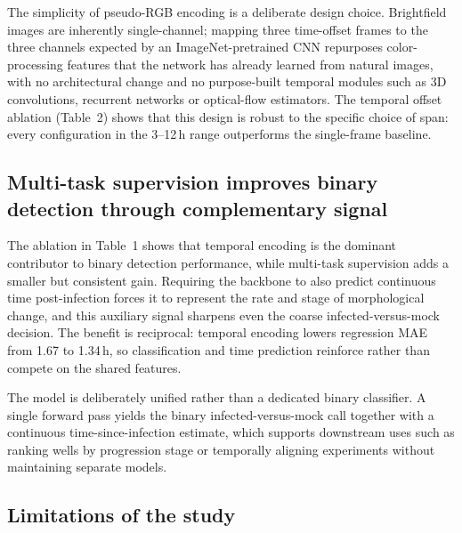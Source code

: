 \documentclass[12pt,letterpaper]{article}
\begin{document}
The simplicity of pseudo-RGB encoding is a deliberate design choice. Brightfield images are inherently single-channel; mapping three time-offset frames to the three channels expected by an ImageNet-pretrained CNN repurposes color-processing features that the network has already learned from natural images, with no architectural change and no purpose-built temporal modules such as 3D convolutions, recurrent networks or optical-flow estimators. The temporal offset ablation (Table~2) shows that this design is robust to the specific choice of span: every configuration in the 3--12\,h range outperforms the single-frame baseline.

\subsection*{Multi-task supervision improves binary detection through complementary signal}

The ablation in Table~1 shows that temporal encoding is the dominant contributor to binary detection performance, while multi-task supervision adds a smaller but consistent gain. Requiring the backbone to also predict continuous time post-infection forces it to represent the rate and stage of morphological change, and this auxiliary signal sharpens even the coarse infected-versus-mock decision.\cite{ref-caruana1997mtl} The benefit is reciprocal: temporal encoding lowers regression MAE from 1.67 to 1.34\,h, so classification and time prediction reinforce rather than compete on the shared features.

The model is deliberately unified rather than a dedicated binary classifier. A single forward pass yields the binary infected-versus-mock call together with a continuous time-since-infection estimate, which supports downstream uses such as ranking wells by progression stage or temporally aligning experiments without maintaining separate models.

\subsection*{Limitations of the study}
\end{document}
